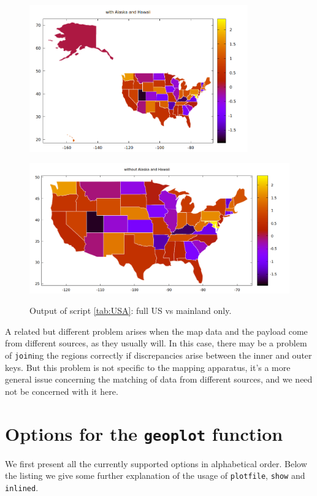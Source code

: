 \documentclass{article}
\begin{document}
\begin{figure}[p]
  \begin{center}
  \includegraphics[height=180pt]{us0.png}

  \includegraphics[height=180pt]{us1.png}
\end{center}
\caption{Output of script \ref{tab:USA}: full US vs mainland only.}
\label{fig:USA}
\end{figure}

A related but different problem arises when the map data and the
payload come from different sources, as they usually will. In this
case, there may be a problem of \texttt{join}ing the regions correctly
if discrepancies arise between the inner and outer keys. But this
problem is not specific to the mapping apparatus, it's a more general
issue concerning the matching of data from different sources, and we
need not be concerned with it here.

\section{Options for the \texttt{geoplot} function}
\label{sec:opts}

We first present all the currently supported options in alphabetical
order. Below the listing we give some further explanation of the usage
of \texttt{plotfile}, \texttt{show} and \texttt{inlined}.
\end{document}
